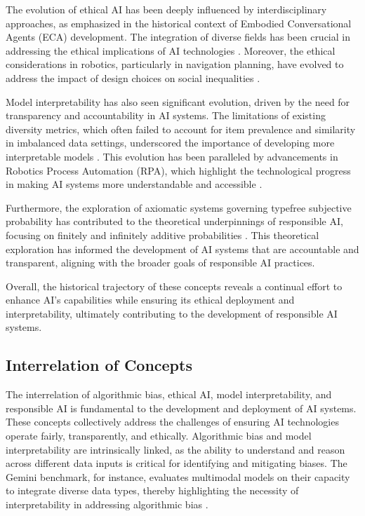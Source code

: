 The evolution of ethical AI has been deeply influenced by interdisciplinary approaches, as emphasized in the historical context of Embodied Conversational Agents (ECA) development. The integration of diverse fields has been crucial in addressing the ethical implications of AI technologies \cite{korre2023takesvillagemultidisciplinaritycollaboration}. Moreover, the ethical considerations in robotics, particularly in navigation planning, have evolved to address the impact of design choices on social inequalities \cite{brandao2020fairnavigationplanninghumanitarian}.



Model interpretability has also seen significant evolution, driven by the need for transparency and accountability in AI systems. The limitations of existing diversity metrics, which often failed to account for item prevalence and similarity in imbalanced data settings, underscored the importance of developing more interpretable models \cite{pasarkar2024cousinsvendiscorefamily}. This evolution has been paralleled by advancements in Robotics Process Automation (RPA), which highlight the technological progress in making AI systems more understandable and accessible \cite{pandy2024advancementsroboticsprocessautomation}.



Furthermore, the exploration of axiomatic systems governing typefree subjective probability has contributed to the theoretical underpinnings of responsible AI, focusing on finitely and infinitely additive probabilities \cite{cieslinski2022axiomstypefreesubjectiveprobability}. This theoretical exploration has informed the development of AI systems that are accountable and transparent, aligning with the broader goals of responsible AI practices.



Overall, the historical trajectory of these concepts reveals a continual effort to enhance AI's capabilities while ensuring its ethical deployment and interpretability, ultimately contributing to the development of responsible AI systems.



\subsection{Interrelation of Concepts} \label{subsec:Interrelation of Concepts}

The interrelation of algorithmic bias, ethical AI, model interpretability, and responsible AI is fundamental to the development and deployment of AI systems. These concepts collectively address the challenges of ensuring AI technologies operate fairly, transparently, and ethically. Algorithmic bias and model interpretability are intrinsically linked, as the ability to understand and reason across different data inputs is critical for identifying and mitigating biases. The Gemini benchmark, for instance, evaluates multimodal models on their capacity to integrate diverse data types, thereby highlighting the necessity of interpretability in addressing algorithmic bias \cite{team2023gemini}.



